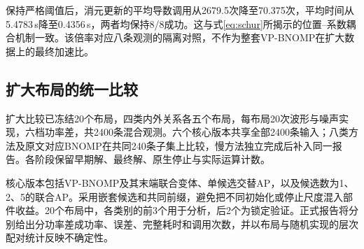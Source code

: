 保持严格阈值后，消元更新的平均导数调用从2679.5次降至70.375次，平均时间从5.4783\,s降至0.4356\,s，两者均保持8/8成功。这与式\eqref{eq:schur}所揭示的位置--系数耦合机制一致。该倍率对应八条观测的隔离对照，不作为整套VP-BNOMP在扩大数据上的最终加速比。

\subsection{扩大布局的统一比较}\label{sec:formalpending}
扩大比较已冻结20个布局，四类内外关系各五个布局，每布局20次波形与噪声实现，六档功率差，共2400条混合观测。六个核心版本共享全部2400条输入；八类方法及原文对应BNOMP在共同240条子集上比较，慢方法独立完成后补入同一报告。各阶段保留早期解、最终解、原生停止与实际运算计数。

核心版本包括VP-BNOMP及其末端联合变体、单候选交替AP，以及候选数为1、2、5的联合AP。采用嵌套候选和共同前缀，避免把不同初始化或停止尺度混入部件收益。20个布局中，各类别的前3个用于分析，后2个为锁定验证。正式报告将分别给出分功率差成功率、误差、完整耗时和调用次数，并以布局与随机实现的层次配对统计反映不确定性。

